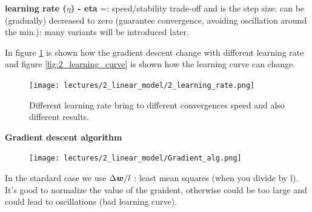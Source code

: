 \documentclass[../main.tex]{subfiles}
\begin{document}
\textbf{learning rate ($\eta$) - eta} =: speed/stability trade-off and is the step size: can be (gradually) decreased to zero (guarantee convergence, avoiding oscillation around the min.): many variants will be introduced later.

In figure \ref{fig:2_learning_rate} is shown how the gradient descent change with different learning rate and figure \ref{fig:2_learning_curve} is shown how the learning curve can change.

\begin{figure}[H]
    \centering
    \texttt{[image: lectures/2\_linear\_model/2\_learning\_rate.png]}
    \caption{Different learning rate bring to different convergences speed and also different results.}
    \label{fig:2_learning_rate}
\end{figure}
\noindent\textbf{Gradient descent algorithm}
\begin{figure}[H]
    \centering
    \texttt{[image: lectures/2\_linear\_model/Gradient\_alg.png]}
    \label{fig:2_gradient_alg}
\end{figure}

In the stardard case we use $\Delta \boldsymbol{w}/ l$ : least mean squares (when you divide by l). It's good to normalize the value of the graident, otherwise could be too large and could lead to oscillations (bad learning curve).
\end{document}
